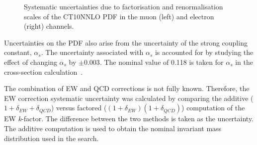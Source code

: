 \begin{figure}[h!]
\begin{subfigure}[h]{0.42\textwidth}
        \label{fig:uncert:eescaleZ}
    \end{subfigure}
    \caption{Systematic uncertainties due to factorisation and renormalisation scales of the CT10NNLO PDF in the muon (left) and electron (right) channels.}
    \label{fig:uncert:scales}
\end{figure}

Uncertainties on the PDF also arise from the uncertainty of the strong coupling constant, $\alpha_s$. The uncertainty associated with  $\alpha_s$ is accounted for by studying the effect of changing $\alpha_s$ by $\pm 0.003$. The nominal value of 0.118 is taken for $\alpha_s$ in the cross-section calculation~\cite{Butterworth_2016}.

The combination of EW and QCD corrections is not fully known. Therefore, the EW correction systematic uncertainty was calculated by comparing the additive ($1 + \delta_{EW} + \delta_{QCD}$) versus factored ($(1 + \delta_{EW})(1 + \delta_{QCD})$) computation of the EW \emph{k}-factor. The difference between the two methods is taken as the uncertainty. The additive computation is used to obtain the nominal invariant mass distribution used in the search. 

